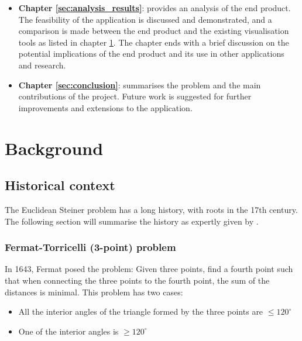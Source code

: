 \documentclass{l4proj}
\begin{document}
\begin{itemize}
    \item \textbf{Chapter \ref{sec:analysis_results}}: provides an analysis of the end product. The feasibility of the application is discussed and demonstrated, and a comparison is made between the end product and the existing visualisation tools as listed in chapter \ref{sec:background}. The chapter ends with a brief discussion on the potential implications of the end product and its use in other applications and research.
    \item \textbf{Chapter \ref{sec:conclusion}}: summarises the problem and the main contributions of the project. Future work is suggested for further improvements and extensions to the application.
\end{itemize}






\chapter{Background}
\label{sec:background}
\section{Historical context}
The Euclidean Steiner problem has a long history, with roots in the 17th century. The following section will summarise the history as expertly given by \cite{Brazil2014}.

\subsection{Fermat-Torricelli (3-point) problem}
In 1643, Fermat posed the problem: Given three points, find a fourth point such that when connecting the three points to the fourth point, the sum of the distances is minimal. This problem has two cases:
\begin{itemize}
    \item All the interior angles of the triangle formed by the three points are $\le 120^\circ$
    \item One of the interior angles is $\geq 120^\circ$
\end{itemize}
\end{document}
